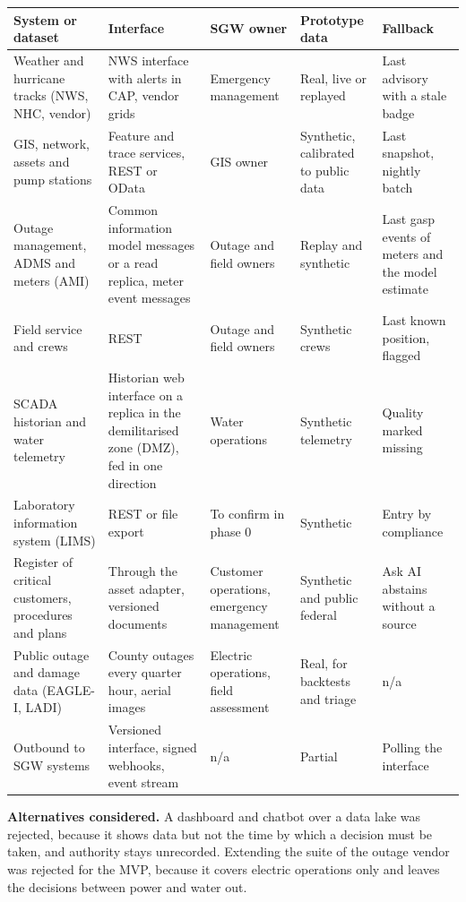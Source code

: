 \documentclass[fontsize=10pt,a4paper,DIV=12,parskip=half-,numbers=noenddot,headsepline,captions=tableheading]{scrartcl}
\begin{document}
{\footnotesize
{}\label{tab:sources}
\begin{tabularx}{\textwidth}{@{}L{3.2cm} L{4.0cm} L{2.4cm} L{2.4cm} Y@{}}
  \toprule
  \textbf{System or dataset} & \textbf{Interface} & \textbf{SGW owner} & \textbf{Prototype data} & \textbf{Fallback} \\ \midrule
  Weather and hurricane tracks (NWS, NHC, vendor) & NWS interface with alerts in CAP, vendor grids & Emergency management & Real, live or replayed \citep{noaa_hurdat2} & Last advisory with a stale badge \\ \lightrowrule
  GIS, network, assets and pump stations & Feature and trace services, REST or OData & GIS owner & Synthetic, calibrated to public data & Last snapshot, nightly batch \\ \lightrowrule
  Outage management, ADMS and meters (AMI) & Common information model messages or a read replica, meter event messages & Outage and field owners & Replay and synthetic & Last gasp events of meters and the model estimate \\ \lightrowrule
  Field service and crews & REST & Outage and field owners & Synthetic crews & Last known position, flagged \\ \lightrowrule
  SCADA historian and water telemetry & Historian web interface on a replica in the demilitarised zone (DMZ), fed in one direction & Water operations & Synthetic telemetry & Quality marked missing \\ \lightrowrule
  Laboratory information system (LIMS) & REST or file export & To confirm in phase 0 & Synthetic & Entry by compliance \\ \lightrowrule
  Register of critical customers, procedures and plans & Through the asset adapter, versioned documents & Customer operations, emergency management & Synthetic and public federal & Ask AI abstains without a source \\ \lightrowrule
  Public outage and damage data (EAGLE-I, LADI) & County outages every quarter hour, aerial images & Electric operations, field assessment & Real, for backtests and triage \citep{doe_eaglei} & n/a \\ \lightrowrule
  Outbound to SGW systems & Versioned interface, signed webhooks, event stream & n/a & Partial & Polling the interface \\ \bottomrule
\end{tabularx}}

\textbf{Alternatives considered.}
A dashboard and chatbot over a data lake was rejected, because it shows data but not the time by which a decision must be taken, and authority stays unrecorded.
Extending the suite of the outage vendor was rejected for the MVP, because it covers electric operations only and leaves the decisions between power and water out.
\end{document}
